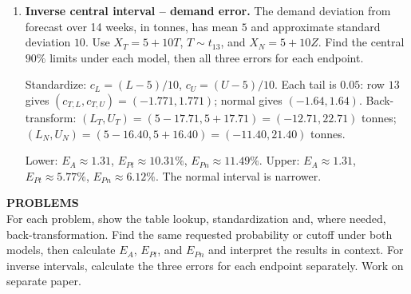 \begin{enumerate}[leftmargin=*,label=\textbf{\arabic*.},itemsep=5pt]
		\par \textit{Region and cumulative target:} the required left tail is $P(X<x)=0.025$. Since this is already a left-tail probability, the cumulative target remains $0.025$; its complement is $P(X>x)=0.975$. Standardize: $c=(x+1)/3$, so seek $F_{10}(c_T)=0.025$ and $\Phi(c_N)=0.025$.
		\par \textit{Table lookup:} row $10$, $\alpha=0.025$ gives $P(T>2.228)=0.025$. By symmetry, $P(T<-2.228)=0.025$, so $c_T=-2.228$. For normal, use $\Phi(1.96)=0.9750$ and $\Phi(-1.96)=1-0.9750=0.0250$, giving $c_N=-1.96$.
		\par \textit{Back-transformation:} $x=-1+3c$ gives $x_T=-1+3(-2.228)=-7.684\approx\boxed{-7.68\ \text{thousand dollars}}$ and $x_N=-1+3(-1.96)=\boxed{-6.88\ \text{thousand dollars}}$.
		\par \textit{Comparison:} use the unrounded cutoffs: $E_A=|-7.684-(-6.88)|=0.804\approx0.80$ thousand dollars, $E_{Pt}=100(0.804)/7.684\approx10.46\%$, $E_{Pn}=100(0.804)/6.88\approx11.69\%$. About $2.5\%$ of weeks have sales more than $7.68$ thousand dollars below target under $t$, or $6.88$ thousand dollars below target under normal.
		\item \textbf{Inverse central interval -- demand error.} The demand deviation from forecast over 14 weeks, in tonnes, has mean $5$ and approximate standard deviation $10$. Use $X_T=5+10T$, $T\sim t_{13}$, and $X_N=5+10Z$. Find the central $90\%$ limits under each model, then all three errors for each endpoint.
		\par Standardize: $c_L=(L-5)/10$, $c_U=(U-5)/10$. Each tail is $0.05$: row $13$ gives $(c_{T,L},c_{T,U})=(-1.771,1.771)$; normal gives $(-1.64,1.64)$. Back-transform: $(L_T,U_T)=(5-17.71,5+17.71)=(-12.71,22.71)$ tonnes; $(L_N,U_N)=(5-16.40,5+16.40)=(-11.40,21.40)$ tonnes.
		\par Lower: $E_A\approx1.31$, $E_{Pt}\approx10.31\%$, $E_{Pn}\approx11.49\%$. Upper: $E_A\approx1.31$, $E_{Pt}\approx5.77\%$, $E_{Pn}\approx6.12\%$. The normal interval is narrower.
	\end{enumerate}
	\newpage
	\textbf{PROBLEMS}\\
	For each problem, show the table lookup, standardization and, where needed, back-transformation. Find the same requested probability or cutoff under both models, then calculate $E_A$, $E_{Pt}$, and $E_{Pn}$ and interpret the results in context. For inverse intervals, calculate the three errors for each endpoint separately. Work on separate paper.
